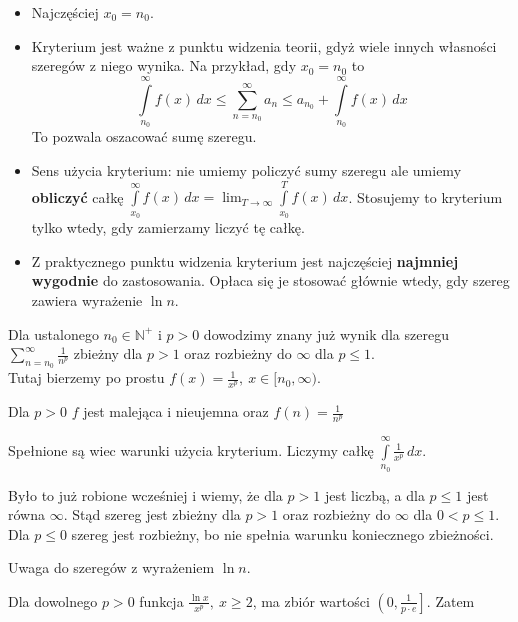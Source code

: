 \begin{itemize}
    \item Najczęściej $ x_0 = n_0 $.
    \item Kryterium jest ważne z punktu widzenia teorii, gdyż wiele innych własności szeregów z niego wynika.
    Na przykład, gdy $x_0 = n_0$ to
    $$ \int\limits_{n_0}^{\infty} f(x) \,dx \leq \sum\limits_{n = n_0}^{\infty} a_n \leq 
    a_{n_0} + \int\limits_{n_0}^{\infty} f(x) \,dx $$
    To pozwala oszacować sumę szeregu.

    \item Sens użycia kryterium: nie umiemy policzyć sumy szeregu ale umiemy \textbf{obliczyć} całkę
    $ \int\limits_{x_0}^{\infty} f(x) \,dx = \lim_{T \to \infty} \int\limits_{x_0}^{T} f(x) \,dx $. Stosujemy to
    kryterium tylko wtedy, gdy zamierzamy liczyć tę całkę.

    \item Z praktycznego punktu widzenia kryterium jest najczęściej \textbf{najmniej wygodnie} do zastosowania.
    Opłaca się je stosować głównie wtedy, gdy szereg zawiera wyrażenie $\ln n$. \\
\end{itemize}

\begin{przyklad}

Dla ustalonego $ n_0 \in \mathbb{N}^+ $ i $p > 0$ dowodzimy znany już wynik dla szeregu $ \sum\limits_{n = n_0}^{\infty} \frac{1}{n^p} $
zbieżny dla $p > 1$ oraz rozbieżny do $\infty$ dla $p \leq 1$. \\

Tutaj bierzemy po prostu $ f(x) = \frac{1}{x^p}, \ x \in [n_0, \infty) $.

Dla $p > 0$ $f$ jest malejąca i nieujemna oraz $ f(n) = \frac{1}{n^p} $ 

Spełnione są wiec warunki użycia kryterium. Liczymy całkę $ \int\limits_{n_0}^{\infty} \frac{1}{x^p} \,dx $.

Było to już robione wcześniej i wiemy, że dla $p > 1$ jest liczbą, a dla $p \leq 1$ jest równa $\infty$.
Stąd szereg jest zbieżny dla $p > 1$ oraz rozbieżny do $\infty$ dla $0 < p \leq 1$. Dla $p \leq 0$ szereg jest rozbieżny,
bo nie spełnia warunku koniecznego zbieżności.
\end{przyklad}

Uwaga do szeregów z wyrażeniem $\ln n$.

Dla dowolnego $p>0$ funkcja $\frac{\ln x}{x^p}, \ x \geq 2$, ma zbiór wartości $\left( 0, \frac{1}{p \cdot e} \right]$. Zatem

